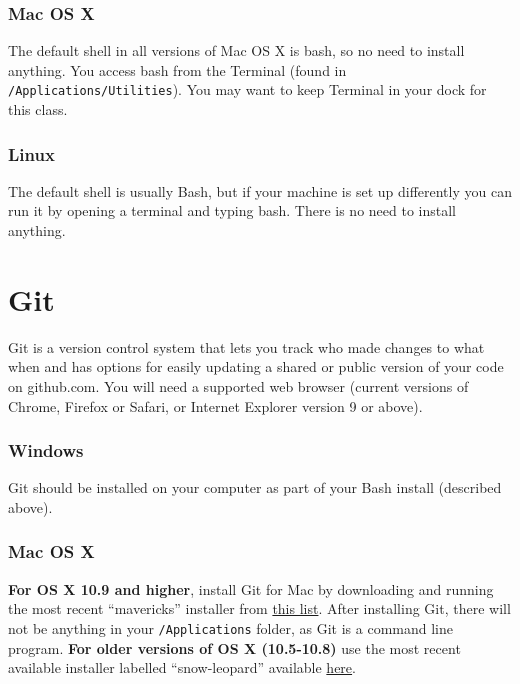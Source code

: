 \documentclass[]{book}
\begin{document}
\hypertarget{mac-os-x}{%
\subsubsection*{Mac OS X}\label{mac-os-x}}

The default shell in all versions of Mac OS X is bash, so no need to install anything. You access bash from the Terminal (found in \texttt{/Applications/Utilities}). You may want to keep Terminal in your dock for this class.

\hypertarget{linux}{%
\subsubsection*{Linux}\label{linux}}

The default shell is usually Bash, but if your machine is set up differently you can run it by opening a terminal and typing bash. There is no need to install anything.

\hypertarget{git}{%
\section{Git}\label{git}}

Git is a version control system that lets you track who made changes to what when and has options for easily updating a shared or public version of your code on github.com. You will need a supported web browser (current versions of Chrome, Firefox or Safari, or Internet Explorer version 9 or above).

\hypertarget{windows-1}{%
\subsubsection*{Windows}\label{windows-1}}

Git should be installed on your computer as part of your Bash install (described above).

\hypertarget{mac-os-x-1}{%
\subsubsection*{Mac OS X}\label{mac-os-x-1}}

\textbf{For OS X 10.9 and higher}, install Git for Mac by downloading and running the most recent ``mavericks'' installer from \href{http://sourceforge.net/projects/git-osx-installer/files/}{this list}. After installing Git, there will not be anything in your \texttt{/Applications} folder, as Git is a command line program. \textbf{For older versions of OS X (10.5-10.8)} use the most recent available installer labelled ``snow-leopard'' available \href{http://sourceforge.net/projects/git-osx-installer/files/}{here}.
\end{document}
